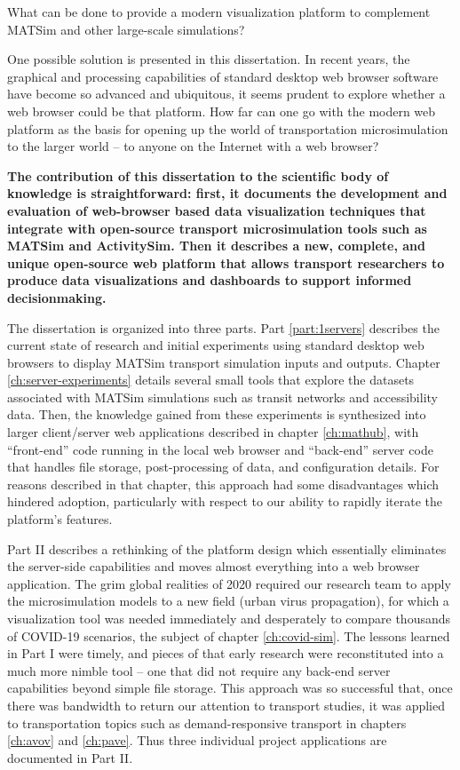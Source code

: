 What can be done to provide a modern visualization platform to complement MATSim and other large-scale simulations?

One possible solution is presented in this dissertation. In recent years, the graphical and processing capabilities of standard desktop web browser software have become so advanced and ubiquitous, it seems prudent to explore whether a web browser could be that platform. How far can one go with the modern web platform as the basis for opening up the world of transportation microsimulation to the larger world -- to anyone on the Internet with a web browser?

\textbf{The contribution of this dissertation to the scientific body of knowledge is straightforward: first, it documents the development and evaluation of web-browser based data visualization techniques that integrate with open-source transport microsimulation tools such as MATSim and ActivitySim. Then it describes a new, complete, and unique open-source web platform that allows transport researchers to produce data visualizations and dashboards to support informed decisionmaking.}

The dissertation is organized into three parts. Part \ref{part:1servers} describes the current state of research and initial experiments using standard desktop web browsers to display MATSim transport simulation inputs and outputs. Chapter \ref{ch:server-experiments} details several small tools that explore the datasets associated with MATSim simulations such as transit networks and accessibility data. Then, the knowledge gained from these experiments is synthesized into larger client/server web applications described in chapter \ref{ch:mathub}, with ``front-end'' code running in the local web browser and ``back-end'' server code that handles file storage, post-processing of data, and configuration details. For reasons described in that chapter, this approach had some disadvantages which hindered adoption, particularly with respect to our ability to rapidly iterate the platform's features.

Part II describes a rethinking of the platform design which essentially eliminates the server-side capabilities and moves almost everything into a web browser application. The grim global realities of 2020 required our research team to apply the microsimulation models to a new field (urban virus propagation), for which a visualization tool was needed immediately and desperately to compare thousands of COVID-19 scenarios, the subject of chapter \ref{ch:covid-sim}. The lessons learned in Part I were timely, and pieces of that early research were reconstituted into a much more nimble tool -- one that did not require any back-end server capabilities beyond simple file storage. This approach was so successful that, once there was bandwidth to return our attention to transport studies, it was applied to transportation topics such as demand-responsive transport in chapters \ref{ch:avov} and \ref{ch:pave}. Thus three individual project applications are documented in Part II.

